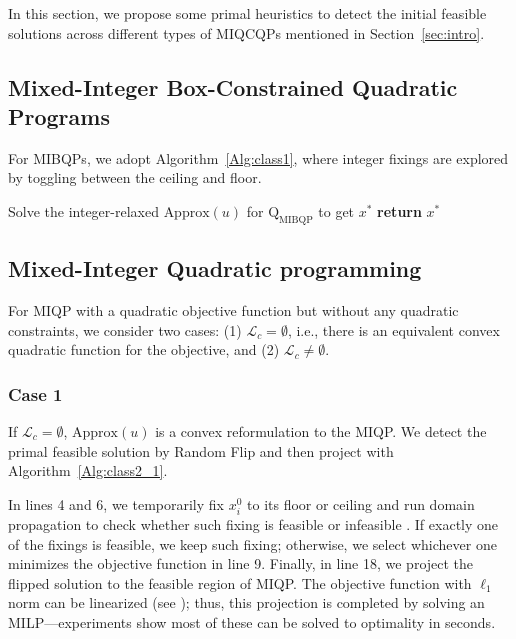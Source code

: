 \documentclass[]{article}
\begin{document}
In this section, we propose some primal heuristics to detect the initial feasible solutions across different types of MIQCQPs mentioned in Section~\ref {sec:intro}.

\subsection{Mixed-Integer Box-Constrained Quadratic Programs}

For MIBQPs, we adopt Algorithm~\ref{Alg:class1}, where integer fixings are explored by toggling between the ceiling and floor.

\begin{algorithm}[!htbp]
\SetAlgoLined
\LinesNumbered
{}
 Solve the integer-relaxed $\mbox{Approx}(u)$ for $\mathrm{Q}_{\mathrm{MIBQP}}$ to get $x^{*}$\;
 \textbf{return} $x^*$
 \caption{Random Flip}
 \label{Alg:class1}
\end{algorithm}


\subsection{Mixed-Integer Quadratic programming}

For MIQP with a quadratic objective function but without any quadratic constraints, we consider two cases: (1) $\mathcal{L}_c=\emptyset$, i.e., there is an equivalent convex quadratic function for the objective, and (2) $\mathcal{L}_c \neq \emptyset$.

\subsubsection{Case 1}
If $\mathcal{L}_c=\emptyset$, $\mbox{Approx}(u)$ is a convex reformulation to the MIQP. We detect the primal feasible solution by Random Flip and then project with Algorithm~\ref{Alg:class2_1}. 

In lines 4 and 6, we temporarily fix $x_i^0$ to its floor or ceiling and run domain propagation to check whether such fixing is feasible or infeasible \cite{fischetti2009feasibility}. If exactly one of the fixings is feasible, we keep such fixing; otherwise, we select whichever one minimizes the objective function in line 9. Finally, in line 18, we project the flipped solution to the feasible region of MIQP. The objective function with $\ell_1$ norm can be linearized (see \cite{fischetti2005feasibility}); thus, this projection is completed by solving an MILP---experiments show most of these can be solved to optimality in seconds.
\end{document}
